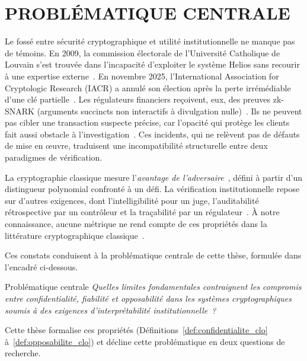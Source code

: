 \section{PROBL\'EMATIQUE CENTRALE}
\label{sec:ig_problematique}
\begin{sloppypar}

Le foss\'e entre s\'ecurit\'e cryptographique et utilit\'e institutionnelle ne
manque pas de t\'emoins. En 2009, la commission \'electorale de l'Universit\'e Catholique
de Louvain s'est trouv\'ee dans l'incapacit\'e d'exploiter le syst\`eme Helios sans recourir
\`a une expertise externe~\cite{Adida09UCL}. En novembre 2025, l'International Association
for Cryptologic Research (IACR) a annul\'e son \'election apr\`es la perte irr\'em\'ediable
d'une cl\'e partielle~\cite{IACR2025incident}.
Les r\'egulateurs financiers re\c{c}oivent, eux, des preuves zk-SNARK (arguments succincts non interactifs \`a divulgation nulle)~\cite{Groth16,BenSasson2019,PLONK20}. Ils ne peuvent
pas cibler une transaction suspecte pr\'ecise, car l'opacit\'e qui prot\`ege les clients
fait aussi obstacle \`a l'investigation~\cite{Casey16,Garratt19}. Ces incidents, qui ne rel\`event pas de d\'efauts de mise en
\oe uvre, traduisent une incompatibilit\'e structurelle entre deux paradigmes
de v\'erification.

La cryptographie classique mesure l'\emph{avantage de l'adversaire}~\cite{GMR88,Shoup01},
d\'efini \`a partir d'un distingueur polynomial confront\'e \`a un d\'efi.
La v\'erification institutionnelle repose sur d'autres exigences, dont l'intelligibilit\'e
pour un juge, l'auditabilit\'e r\'etrospective par un contr\^oleur et la tra\c{c}abilit\'e par un r\'egulateur~\cite{Citron14,Casey11}.
\`A notre connaissance, aucune m\'etrique ne rend compte de ces propri\'et\'es dans la litt\'erature cryptographique
classique~\cite{GMR85,Goldreich01}.

Ces constats conduisent \`a la probl\'ematique centrale de cette th\`ese, formul\'ee dans l'encadr\'e ci-dessous.

\begin{boiteProblematique}{Probl\'ematique centrale}
\textit{Quelles limites fondamentales contraignent les compromis entre confidentialit\'e, fiabilit\'e et opposabilit\'e dans les syst\`emes cryptographiques soumis \`a des exigences d'interpr\'etabilit\'e institutionnelle~?}
\end{boiteProblematique}

Cette th\`ese formalise ces propri\'et\'es (D\'efinitions~\ref{def:confidentialite_clo} \`a~\ref{def:opposabilite_clo}) et d\'ecline cette probl\'ematique en deux questions de recherche.


\end{sloppypar}
